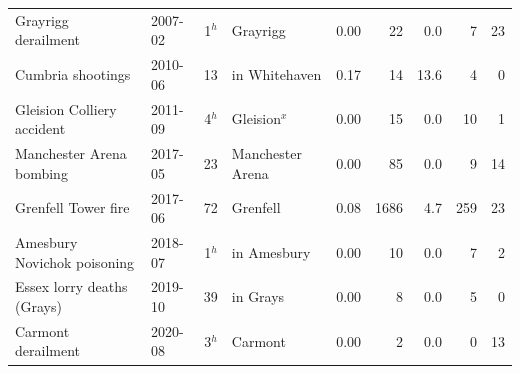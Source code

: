\documentclass[11pt,a4paper]{article}
\begin{document}
{\begin{longtable}{p{5.2cm}lrlrrrrr}
Grayrigg derailment & 2007-02 & 1$^h$ & Grayrigg & 0.00 & 22 & 0.0 & 7 & 23\\
Cumbria shootings & 2010-06 & 13 & in Whitehaven & 0.17 & 14 & 13.6 & 4 & 0\\
Gleision Colliery accident & 2011-09 & 4$^h$ & Gleision$^x$ & 0.00 & 15 & 0.0 & 10 & 1\\
Manchester Arena bombing & 2017-05 & 23 & Manchester Arena & 0.00 & 85 & 0.0 & 9 & 14\\
Grenfell Tower fire & 2017-06 & 72 & Grenfell & 0.08 & 1686 & 4.7 & 259 & 23\\
Amesbury Novichok poisoning & 2018-07 & 1$^h$ & in Amesbury & 0.00 & 10 & 0.0 & 7 & 2\\
Essex lorry deaths (Grays) & 2019-10 & 39 & in Grays & 0.00 & 8 & 0.0 & 5 & 0\\
Carmont derailment & 2020-08 & 3$^h$ & Carmont & 0.00 & 2 & 0.0 & 0 & 13\\
\end{longtable}}
\end{document}
